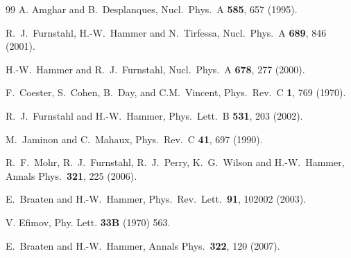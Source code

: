 \documentclass[aps,rmp,nofootinbib,twocolumn,floatfix]{revtex4}
\begin{document}
\begin{thebibliography}{99}
A. Amghar and B.~Desplanques,
 Nucl.\ Phys.\ A {\bf 585}, 657 (1995).
%

  R.~J.~Furnstahl, H.-W.~Hammer and N.~Tirfessa, 
  Nucl.\ Phys.\  A {\bf 689}, 846 (2001). 


  H.-W.~Hammer and R.~J.~Furnstahl,
  Nucl.\ Phys.\  A {\bf 678}, 277 (2000).

F.~Coester, S.~Cohen, B.~Day, and C.M.\ Vincent,
    Phys.\ Rev.\ C {\bf 1}, 769 (1970).


  R.~J.~Furnstahl and H.-W.~Hammer,
  Phys.\ Lett.\  B {\bf 531}, 203 (2002).

  M.~Jaminon and C.~Mahaux,
  Phys.\ Rev.\  C {\bf 41}, 697 (1990).






  R.~F.~Mohr, R.~J.~Furnstahl, R.~J.~Perry, K.~G.~Wilson and H.-W.~Hammer,
  Annals Phys.\  {\bf 321}, 225 (2006).

  E.~Braaten and H.-W.~Hammer, 
  Phys.\ Rev.\ Lett.\  {\bf 91}, 102002 (2003). 
 
V. Efimov, 
Phy. Lett. {\bf 33B} (1970) 563.

  E.~Braaten and H.-W.~Hammer,
  Annals Phys.\  {\bf 322}, 120 (2007).


\end{thebibliography}
\end{document}

